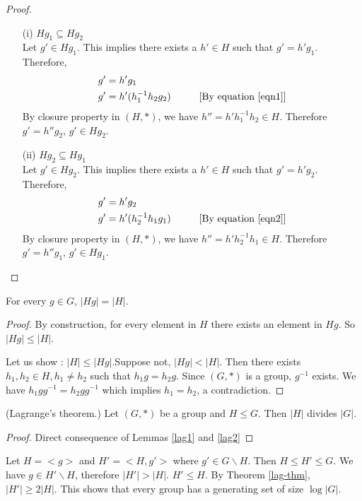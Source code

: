 \begin{observation}
\begin{definition}
\begin{proof}
\begin{itemize}
\item[(i)] $Hg_1\subseteq Hg_2$ \\
Let $g'\in Hg_1$. This implies there exists a $h'\in H$ such that $g'=h'g_1$. Therefore,
\begin{align*}
g'&= h'g_1\\
g'&= h'(h_1^{-1}h_2g_2) \hspace*{10mm} [\text{By equation \eqref{eqn1}}]
\end{align*} 
By closure property in $(H,*)$, we have $h''=h'h_1^{-1}h_2\in H$. Therefore $g'=h''g_2$, $g'\in Hg_2$.
\item[(ii)] $Hg_2\subseteq Hg_1$ \\
Let $g'\in Hg_2$. This implies there exists a $h'\in H$ such that $g'=h'g_2$. Therefore,
\begin{align*}
g'&= h'g_2\\
g'&= h'(h_2^{-1}h_1g_1) \hspace*{10mm} [\text{By equation \eqref{eqn2}}]
\end{align*} 
By closure property in $(H,*)$, we have $h''=h'h_2^{-1}h_1\in H$. Therefore $g'=h''g_1$, $g'\in Hg_1$.
\end{itemize}
\end{proof}

\begin{lemma}
\label{lag2}
For every $g\in G$, $|Hg|=|H|$.
\end{lemma}
\begin{proof}
By construction, for every element in $H$ there exists an element in $Hg$. So $|Hg|\leq |H|$. 

Let us show : $|H|\leq |Hg|$.Suppose not, $|Hg|<|H|$. Then there exists $h_1,h_2\in H, h_1\neq h_2$ such that $h_1g = h_2g$. Since $(G,*)$ is a group, $g^{-1}$ exists. We have $h_1gg^{-1} = h_2gg^{-1}$ which implies $h_1=h_2$, a contradiction.
\end{proof}

\begin{theorem}(Lagrange's theorem.)
\label{lag-thm}
Let $(G,*)$ be a group and $H\leq G$. Then $|H|$ divides $|G|$.
\end{theorem}
\begin{proof}
Direct consequence of Lemmas \ref{lag1} and \ref{lag2}
\end{proof}


\begin{observation}
\label{obs-genset}
Let $H=<g>$ and $H'=<H,g'>$ where $g'\in G\backslash H$. Then $H\leq H'\leq G$. We have $g\in H'\backslash H$, therefore $|H'|>|H|$. $H'\leq H$. By Theorem \ref{lag-thm}, $|H'|\geq 2|H|$. This shows that every group has a generating set of size $\log|G|$.
\end{observation}



\end{definition}
\end{observation}
